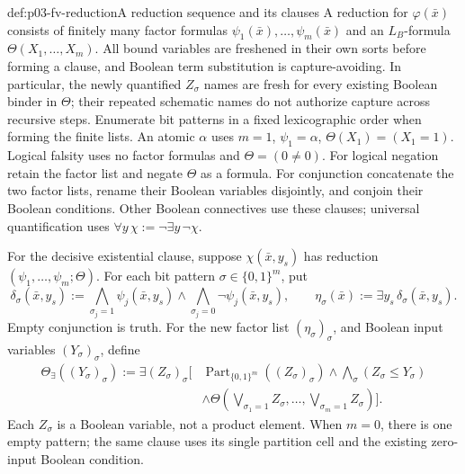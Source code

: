 \begin{hbdefinition}{def:p03-fv-reduction}{A reduction sequence and its clauses}
A reduction for \(\varphi(\bar x)\) consists of finitely many
factor formulas \(\psi_1(\bar x),\ldots,\psi_m(\bar x)\) and an
\(L_B\)-formula \(\Theta(X_1,\ldots,X_m)\).
All bound variables are freshened in their own sorts before forming a
clause, and Boolean term substitution is capture-avoiding. In particular,
the newly quantified \(Z_\sigma\) names are fresh for every existing
Boolean binder in \(\Theta\); their repeated schematic names do not
authorize capture across recursive steps. Enumerate bit patterns in a fixed
lexicographic order when forming the finite lists.
An atomic \(\alpha\) uses \(m=1\), \(\psi_1=\alpha\),
\(\Theta(X_1)=(X_1=1)\). Logical falsity uses no factor formulas and
\(\Theta=(0\ne0)\). For logical negation retain the factor list and
negate \(\Theta\) as a formula. For conjunction concatenate the two
factor lists, rename their Boolean variables disjointly, and conjoin their
Boolean conditions. Other Boolean connectives use these clauses; universal
quantification uses \(\forall y\,\chi:=\neg\exists y\,\neg\chi\).

For the decisive existential clause, suppose \(\chi(\bar x,y_s)\)
has reduction \((\psi_1,\ldots,\psi_m;\Theta)\).
For each bit pattern \(\sigma\in\{0,1\}^m\), put
\[
 \delta_\sigma(\bar x,y_s)
  :=\bigwedge_{\sigma_j=1}\psi_j(\bar x,y_s)
                  \land\bigwedge_{\sigma_j=0}\neg\psi_j(\bar x,y_s),
 \qquad
 \eta_\sigma(\bar x):=\exists y_s\,\delta_\sigma(\bar x,y_s).
\]
Empty conjunction is truth. For the new factor list \((\eta_\sigma)_\sigma\),
and Boolean input variables \((Y_\sigma)_\sigma\), define
\[
\begin{split}
 \Theta_\exists((Y_\sigma)_\sigma):=\exists(Z_\sigma)_\sigma\bigg[
 &\operatorname{Part}_{\{0,1\}^m}((Z_\sigma)_\sigma)
       \land\bigwedge_\sigma(Z_\sigma\le Y_\sigma)\\
 &\land\Theta\left(
          \bigvee_{\sigma_1=1}Z_\sigma,\ldots,
          \bigvee_{\sigma_m=1}Z_\sigma\right)\bigg].
\end{split}
\]
Each \(Z_\sigma\) is a Boolean variable, not a product element.
When \(m=0\), there is one empty pattern; the same clause uses its
single partition cell and the existing zero-input Boolean condition.
\end{hbdefinition}

